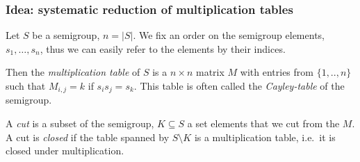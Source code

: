 \documentclass{beamer}
\newcommand{\jump}{\vskip6pt}
\begin{document}
\begin{frame}

\end{frame}

\begin{frame}\frametitle{Idea: systematic reduction of multiplication tables}
Let $S$ be a semigroup, $n=|S|$. We fix an order on the semigroup elements, $s_1,\ldots, s_n$, thus we can easily refer to the elements by their indices. 
\begin{definition}
Then the  \emph{multiplication table} of $S$ is a $n\times n$ matrix $M$ with entries from $\{1,..,n\}$ such that $M_{i,j}=k$ if $s_is_j=s_k$. This table is often called the \emph{Cayley-table} of the semigroup.
\end{definition}

\begin{definition}
A \emph{cut} is a subset of the semigroup, $K\subseteq S$ a set elements that we cut from the $M$.  A cut is \emph{closed} if the table spanned by $S\setminus K$ is a multiplication table, i.e.\ it is closed under multiplication.
\end{definition}
\end{frame}
\end{document}
